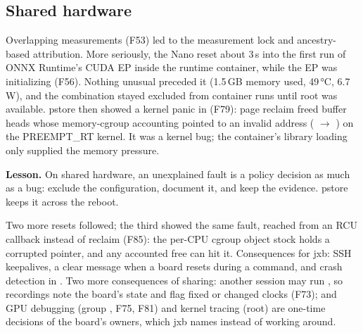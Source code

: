 \documentclass[11pt,a4paper]{article}
\newcommand{\jxb}{\textsf{jxb}}
\newcommand{\finding}[1]{\textsf{\small F#1}}
\begin{document}
\subsection{Shared hardware}
Overlapping measurements (\finding{53}) led to the measurement lock and ancestry-based attribution. More seriously, the
Nano reset about 3\,s into the first run of ONNX Runtime's CUDA EP inside the runtime container, while the EP was
initializing (\finding{56}). Nothing unusual preceded it (1.5\,GB memory used, 49\,\si{\celsius}, 6.7\,W), and the
combination stayed excluded from container runs until root was available. pstore then showed a kernel panic in
 (\finding{79}): page reclaim freed buffer heads whose memory-cgroup accounting pointed to an invalid
address ( $\to$ ) on the PREEMPT\_RT kernel. It was a kernel bug; the
container's library loading only supplied the memory pressure.
\begin{lesson}\textbf{Lesson.} On shared hardware, an unexplained fault is a policy decision as much as a bug: exclude the
configuration, document it, and keep the evidence. pstore keeps it across the reboot.\end{lesson}
Two more resets followed; the third showed the same fault, reached from an RCU callback instead of reclaim
(\finding{85}): the per-CPU cgroup object stock holds a corrupted pointer, and any accounted free can hit it.
Consequences for \jxb{}: SSH keepalives, a clear message when a board resets during a command, and crash
detection in .
Two more consequences of sharing: another session may run , so recordings note the board's state and
flag fixed or changed clocks (\finding{73}); and GPU debugging (group , \finding{75}, \finding{81}) and kernel
tracing (root) are one-time decisions of the board's owners, which \jxb{} names instead of working around.
\end{document}
